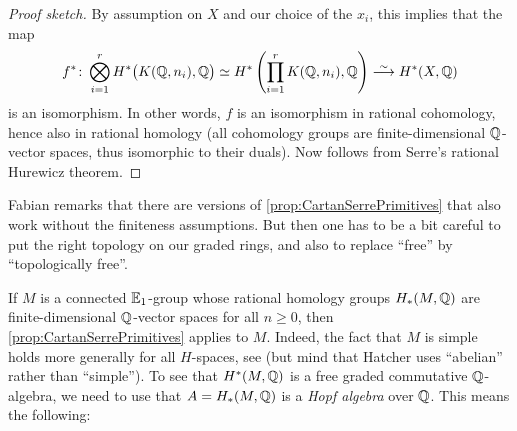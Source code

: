 \begin{proof}[Proof sketch]
	By assumption on $X$ and our choice of the $x_i$, this implies that the map
	\begin{equation*}
		f^*\colon \bigotimes_{i=1}^rH^*\big(K(\IQ,n_i),\IQ\big)\simeq H^*\left(\prod_{i=1}^rK(\IQ,n_i),\IQ\right)\isomorphism H^*(X,\IQ)
	\end{equation*}
	is an isomorphism. In other words, $f$ is an isomorphism in rational cohomology, hence also in rational homology (all cohomology groups are finite-dimensional $\mathbb{Q}$-vector spaces, thus isomorphic to their duals). Now \itememph{\boxtimes} follows from Serre's rational Hurewicz theorem.
\end{proof}
\begin{smallrem}\label{rem:FinitenessAssumptions}
	Fabian remarks that there are versions of \cref{prop:CartanSerrePrimitives} that also work without the finiteness assumptions. But then one has to be a bit careful to put the right topology on our graded rings, and also to replace \enquote{free} by \enquote{topologically free}.
\end{smallrem}
If $M$ is a connected $\mathbb{E}_1$-group whose rational homology groups $H_*(M,\mathbb{Q})$ are finite-dimensional $\mathbb{Q}$-vector spaces for all $n\geq 0$, then \cref{prop:CartanSerrePrimitives} applies to $M$. Indeed, the fact that $M$ is simple holds more generally for all $H$-spaces, see \cite[Example~4A.3]{Hatcher} (but mind that Hatcher uses \enquote{abelian} rather than \enquote{simple}). To see that $H^*(M,\mathbb{Q})$ is a free graded commutative $\mathbb{Q}$-algebra, we need to use that $A=H_*(M,\mathbb{Q})$ is a \emph{Hopf algebra} over $\mathbb{Q}$. This means the following:
